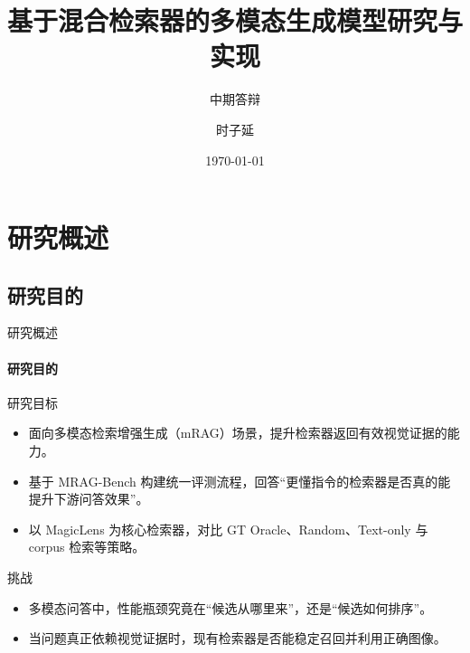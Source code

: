 \documentclass[10pt,aspectratio=169,]{beamer}
\title{基于混合检索器的多模态生成模型研究与实现}
\subtitle{中期答辩}
\author[时子延]{时子延}
\institute[19220422]{指导老师: 宋歌\\计算机与电子信息学院/人工智能学院\\南京师范大学}
\date{\today}
\begin{document}
\maketitle


\section{研究概述}
\subsection{研究目的}
\begin{frame}{研究概述}
	\framesubtitle{研究目的}
	\begin{block}{研究目标}
		\begin{itemize}
			\item 面向多模态检索增强生成（mRAG）场景，提升检索器返回有效视觉证据的能力。
			\item 基于 MRAG-Bench 构建统一评测流程，回答“更懂指令的检索器是否真的能提升下游问答效果”。
			\item 以 MagicLens 为核心检索器，对比 GT Oracle、Random、Text-only 与 corpus 检索等策略。
		\end{itemize}
	\end{block}
	\begin{alertblock}{挑战}
		\begin{itemize}
			\item 多模态问答中，性能瓶颈究竟在“候选从哪里来”，还是“候选如何排序”。
			\item 当问题真正依赖视觉证据时，现有检索器是否能稳定召回并利用正确图像。
		\end{itemize}
	\end{alertblock}
\end{frame}
\end{document}
